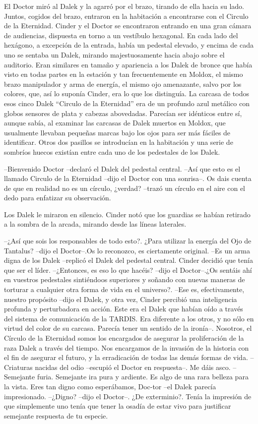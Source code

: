 El Doctor miró al Dalek y la agarró por el brazo, tirando de ella hacia su lado. Juntos, cogidos del brazo, entraron en la habitación a encontrarse con el Circulo de la Eternidad.
Cinder y el Doctor se encontraron entrando en una gran cámara de audiencias, dispuesta en torno a un vestíbulo hexagonal.
En cada lado del hexágono, a excepción de la entrada, había un pedestal elevado, y encima de cada uno se sentaba un Dalek, mirando majestuosamente hacia abajo sobre el auditorio.
Eran similares en tamaño y apariencia a los Dalek de bronce que había visto en todas partes en la estación y tan frecuentemente en Moldox, el mismo brazo manipulador y arma de energía, el mismo ojo amenazante, salvo por los colores, que, así lo suponía Cinder, era lo que los distinguía. La carcasa de todos esos cinco Dalek “Circulo de la Eternidad” era de un profundo azul metálico con globos sensores de plata y cabezas abovedadas. Parecían ser idénticos entre sí, aunque sabía, al examinar las carcasas de Dalek muertos en Moldox, que usualmente llevaban pequeñas marcas bajo los ojos para ser más fáciles de identificar.
Otros dos pasillos se introducían en la habitación y una serie de sombríos huecos existían entre cada uno de los pedestales de los Dalek.

--Bienvenido Doctor --declaró el Dalek del pedestal central.
--Así que esto es el llamado Circulo de la Eternidad --dijo el Doctor con una sonrisa--. Os dais cuenta de que en realidad no es un círculo, ¿verdad? --trazó un círculo en el aire con el dedo para enfatizar su observación.

Los Dalek le miraron en silencio. Cinder notó que los guardias se habían retirado a la sombra de la arcada, mirando desde las líneas laterales.

--¿Así que sois los responsables de todo esto?. ¿Para utilizar la energía del Ojo de Tantalus? --dijo el Doctor--.Os lo reconozco, es ciertamente original.
--Es un arma digna de los Dalek --replicó el Dalek del pedestal central. Cinder decidió que tenía que ser el líder.
--¿Entonces, es eso lo que hacéis? --dijo el Doctor--.¿Os sentáis ahí en vuestros pedestales sintiéndoos superiores y soñando con nuevas maneras de torturar a cualquier otra forma de vida en el universo?.
--Ese es, efectivamente, nuestro propósito --dijo el Dalek, y otra vez, Cinder percibió una inteligencia profunda y perturbadora en acción. Este era el Dalek que habían oído a través del sistema de comunicación de la TARDIS. Era diferente a los otros, y no sólo en virtud del color de su carcasa. Parecía tener un sentido de la ironía--. Nosotros, el Círculo de la Eternidad somos los encargados de asegurar la proliferación de la raza Dalek a través del tiempo. Nos encargamos de la invasión de la historia con el fin de asegurar el futuro, y la erradicación de todas las demás formas de vida.
--Criaturas nacidas del odio --escupió el Doctor en respuesta--. Me dáis asco.
--Semejante furia. Semejante ira pura y ardiente. Es algo de una rara belleza para la vista. Eres tan digno como esperábamos, Doc-tor --el Dalek parecía impresionado.
--¿Digno? --dijo el Doctor--. ¿De exterminio?. Tenía la impresión de que simplemente uno tenía que tener la osadía de estar vivo para justificar semejante respuesta de tu especie.

